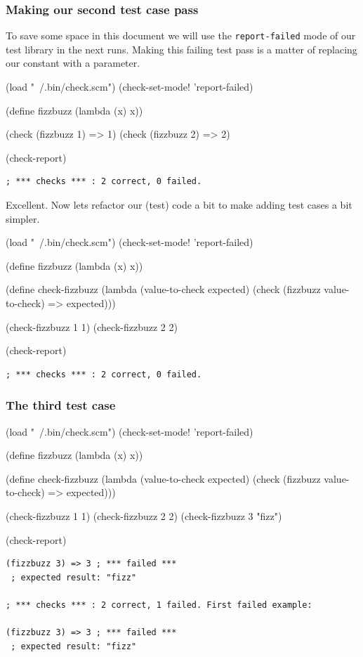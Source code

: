 \documentclass[12pt,a4paper,english,twoside]{article}
\begin{document}
\subsubsection{Making our second test case pass}
To save some space in this document we will use the \texttt{report-failed} 
mode of our test library in the next runs. Making this failing test pass is a 
matter of replacing our constant with a parameter.
\begin{schemecode}
(load "~/.bin/check.scm")
(check-set-mode! 'report-failed)

(define fizzbuzz (lambda (x) x))

(check (fizzbuzz 1) => 1)
(check (fizzbuzz 2) => 2)

(check-report)
\end{schemecode}
\begin{lstlisting}
; *** checks *** : 2 correct, 0 failed.  
\end{lstlisting}
Excellent. Now lets refactor our (test) code a bit to make adding test cases 
a bit simpler.
\begin{schemecode}
(load "~/.bin/check.scm")
(check-set-mode! 'report-failed)

(define fizzbuzz (lambda (x) x))

(define check-fizzbuzz 
  (lambda (value-to-check expected)
    (check (fizzbuzz value-to-check) => expected)))

(check-fizzbuzz 1 1)
(check-fizzbuzz 2 2)

(check-report)
\end{schemecode}
\begin{lstlisting}
; *** checks *** : 2 correct, 0 failed.  
\end{lstlisting}

\subsubsection{The third test case}
\begin{schemecode}
(load "~/.bin/check.scm")
(check-set-mode! 'report-failed)

(define fizzbuzz (lambda (x) x))

(define check-fizzbuzz 
  (lambda (value-to-check expected)
    (check (fizzbuzz value-to-check) => expected)))

(check-fizzbuzz 1 1)
(check-fizzbuzz 2 2)
(check-fizzbuzz 3 "fizz")

(check-report)
\end{schemecode}
\begin{lstlisting}
(fizzbuzz 3) => 3 ; *** failed ***
 ; expected result: "fizz"

; *** checks *** : 2 correct, 1 failed. First failed example:

(fizzbuzz 3) => 3 ; *** failed ***
 ; expected result: "fizz"
\end{lstlisting}
\end{document}
